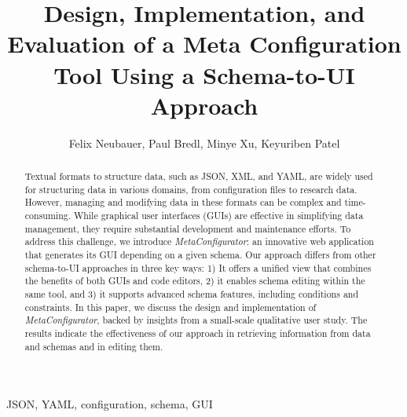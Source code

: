 \documentclass[lettersize,journal]{IEEEtran}
\newcommand{\toolname}{\textit{MetaConfigurator}}
\begin{document}
 \title{Design, Implementation, and Evaluation of a Meta Configuration Tool Using a Schema-to-UI Approach}
 \author{Felix Neubauer, Paul Bredl, Minye Xu, Keyuriben Patel}



 \maketitle

 \begin{abstract}
 Textual formats to structure data, such as JSON, XML, and YAML, are widely used for structuring data in various domains, from configuration files to research data.
 However, managing and modifying data in these formats can be complex and time-consuming.
 While graphical user interfaces (GUIs) are effective in simplifying data management, they require substantial development and maintenance efforts.
 To address this challenge, we introduce \toolname: an innovative web application that generates its GUI depending on a given schema.
 Our approach differs from other schema-to-UI approaches in three key ways: 1) It offers a unified view that combines the benefits of both GUIs and code editors,
 2) it enables schema editing within the same tool, and 3) it supports advanced schema features, including conditions and constraints.
 In this paper, we discuss the design and implementation of \toolname, backed by insights from a small-scale qualitative user study.
The results indicate the effectiveness of our approach in retrieving information from data and schemas and in editing them.


 \end{abstract}

 \begin{IEEEkeywords}
  JSON, YAML, configuration, schema, GUI
 \end{IEEEkeywords}
\end{document}
